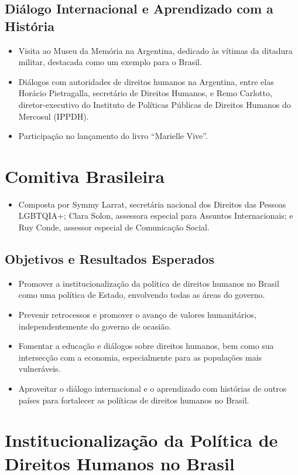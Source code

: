 \documentclass[
   article,       
   12pt,          
   oneside,       
   a4paper,       
   english,       
   brazil,        
   sumario=tradicional
   ]{abntex2}
\begin{document}
\subsection{Diálogo Internacional e Aprendizado com a História}
\begin{itemize}
    \item Visita ao Museu da Memória na Argentina, dedicado às vítimas da ditadura militar, destacada como um exemplo para o Brasil.
    \item Diálogos com autoridades de direitos humanos na Argentina, entre elas Horácio Pietragalla, secretário de Direitos Humanos, e Remo Carlotto, diretor-executivo do Instituto de Políticas Públicas de Direitos Humanos do Mercosul (IPPDH).
    \item Participação no lançamento do livro “Marielle Vive”.
\end{itemize}

\section{Comitiva Brasileira}
\begin{itemize}
    \item Composta por Symmy Larrat, secretária nacional dos Direitos das Pessoas LGBTQIA+; Clara Solon, assessora especial para Assuntos Internacionais; e Ruy Conde, assessor especial de Comunicação Social.
\end{itemize}

\subsection{Objetivos e Resultados Esperados}
\begin{itemize}
    \item Promover a institucionalização da política de direitos humanos no Brasil como uma política de Estado, envolvendo todas as áreas do governo.
    \item Prevenir retrocessos e promover o avanço de valores humanitários, independentemente do governo de ocasião.
    \item Fomentar a educação e diálogos sobre direitos humanos, bem como sua intersecção com a economia, especialmente para as populações mais vulneráveis.
    \item Aproveitar o diálogo internacional e o aprendizado com histórias de outros países para fortalecer as políticas de direitos humanos no Brasil.
\end{itemize}
\section{Institucionalização da Política de Direitos Humanos no Brasil}
\end{document}
